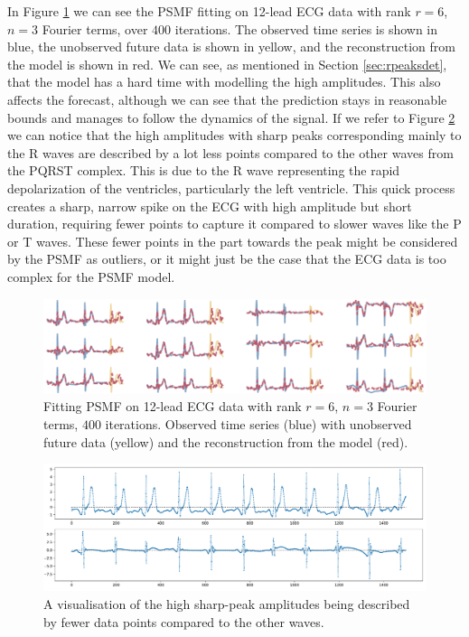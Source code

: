 \documentclass{mldsmsc}
\begin{document}
\noindent In Figure \ref{forecast} we can see the PSMF fitting on 12-lead ECG data with rank $r = 6$, $n = 3$ Fourier terms, over $400$ iterations. The observed time series is shown in blue, the unobserved future data is shown in yellow, and the reconstruction from the model is shown in red. We can see, as mentioned in Section \ref{sec:rpeaksdet}, that the model has a hard time with modelling the high amplitudes. This also affects the forecast, although we can see that the prediction stays in reasonable bounds and manages to follow the dynamics of the signal. If we refer to Figure \ref{problem} we can notice that the high amplitudes with sharp peaks corresponding mainly to the R waves are described by a lot less points compared to the other waves from the PQRST complex. This is due to the R wave representing the rapid depolarization of the ventricles, particularly the left ventricle. This quick process creates a sharp, narrow spike on the ECG with high amplitude but short duration, requiring fewer points to capture it compared to slower waves like the P or T waves. These fewer points in the part towards the peak might be considered by the PSMF as outliers, or it might just be the case that the ECG data is too complex for the PSMF model. \newline

\begin{figure}[h]
\begin{center}
\includegraphics[scale=1]{images/forecast/periodic_fit.pdf}
\caption{Fitting PSMF on 12-lead ECG data with rank $r = 6$, $n = 3$ Fourier terms, $400$ iterations. Observed time series (blue) with unobserved future data (yellow) and the reconstruction from the model (red).}
\label{forecast}
\end{center}
\end{figure}

\begin{figure}[h]
\begin{center}
\includegraphics[scale=0.45]{images/example.pdf}
\caption{A visualisation of the high sharp-peak amplitudes being described by fewer data points compared to the other waves.}
\label{problem}
\end{center}
\end{figure}
\end{document}
